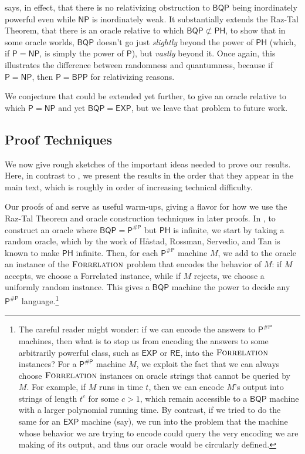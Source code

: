 \documentclass[10pt,a4paper]{article}
\newcommand{\Forrelation}{\normalfont\textsc{Forrelation}}
\begin{document}
 says, in effect, that there is no relativizing obstruction to $\mathsf{BQP}$ being inordinately powerful even while $\mathsf{NP}$ is inordinately weak. It substantially extends the Raz-Tal Theorem, that there is an oracle relative to which $\mathsf{BQP} \not\subset \mathsf{PH}$, to show that in some oracle worlds, $\mathsf{BQP}$ doesn't go just \textit{slightly} beyond the power of $\mathsf{PH}$ (which,
if $\mathsf{P} = \mathsf{NP}$, is simply the power of $\mathsf{P}$), but \textit{vastly} beyond it. Once again, this illustrates the difference between randomness and quantumness, because if $\mathsf{P} = \mathsf{NP}$, then $\mathsf{P} = \mathsf{BPP}$ for relativizing reasons.

We conjecture that  could be extended yet further, to give an oracle relative to which $\mathsf{P} = \mathsf{NP}$ and yet $\mathsf{BQP} = \mathsf{EXP}$, but we leave that problem to future work.

\subsection{Proof Techniques}

We now give rough sketches of the important ideas needed to prove our results. Here, in contrast to , we present the results in the order that they appear in the main text, which is roughly in order of increasing technical difficulty.

Our proofs of  and  serve as useful warm-ups, giving a flavor for how we use the Raz-Tal Theorem and oracle construction techniques in later proofs. In , to construct an oracle where $\mathsf{BQP} = \mathsf{P^{\# P}}$ but $\mathsf{PH}$ is infinite, we start by taking a random oracle, which by the work of H\r{a}stad, Rossman, Servedio, and Tan \cite{HRST17, RST15} is known to make $\mathsf{PH}$ infinite. Then, for each $\mathsf{P^{\# P}}$ machine $M$, we add to the oracle an instance of the $\Forrelation$ problem that encodes the behavior of $M$: if $M$ accepts, we choose a Forrelated instance, while if $M$ rejects, we choose a uniformly random instance. This gives a $\mathsf{BQP}$ machine the power to decide any $\mathsf{P^{\# P}}$ language.\footnote{The careful reader might wonder: if we can encode the answers to $\mathsf{P^{\# P}}$ machines, then what is to stop us from encoding the answers to some arbitrarily powerful class, such as $\mathsf{EXP}$ or $\mathsf{RE}$, into the $\Forrelation$ instances? For a $\mathsf{P^{\# P}}$ machine $M$, we exploit the fact that we can always choose $\Forrelation$ instances on oracle strings that cannot be queried by $M$. For example, if $M$ runs in time $t$, then we can encode $M$'s output into strings of length $t^c$ for some $c > 1$, which remain accessible to a $\mathsf{BQP}$ machine with a larger polynomial running time. By contrast, if we tried to do the same for an $\mathsf{EXP}$ machine (say), we run into the problem that the machine whose behavior we are trying to encode could query the very encoding we are making of its output, and thus our oracle would be circularly defined.}
\end{document}
